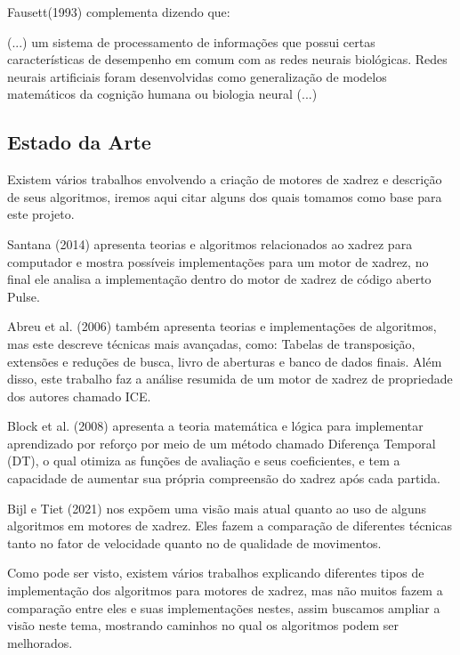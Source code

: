 Fausett(1993) complementa dizendo que:
\begin{citacao}
    (...) um sistema de processamento de informações que possui certas características de desempenho em comum com as redes
    neurais biológicas. Redes neurais artificiais foram desenvolvidas como generalização de modelos matemáticos da cognição
    humana ou biologia neural (...) \cite[tradução nossa, p.3]{FAUSETT}
\end{citacao}

\subsection{Estado da Arte}

Existem vários trabalhos envolvendo a criação de motores de xadrez e descrição de seus algoritmos, iremos aqui citar
alguns dos quais tomamos como base para este projeto.

Santana (2014) apresenta teorias e algoritmos relacionados ao xadrez para computador e mostra possíveis implementações
para um motor de xadrez, no final ele analisa a implementação dentro do motor de xadrez de código aberto Pulse.

Abreu et al. (2006) também apresenta teorias e implementações de algoritmos, mas este descreve técnicas mais avançadas,
como: Tabelas de transposição, extensões e reduções de busca, livro de aberturas e banco de dados finais. Além disso,
este trabalho faz a análise resumida de um motor de xadrez de propriedade dos autores chamado ICE.

Block et al. (2008) apresenta a teoria matemática e lógica para implementar aprendizado por reforço por meio de um
método chamado Diferença Temporal (DT), o qual otimiza as funções de avaliação e seus coeficientes, e tem a capacidade
de aumentar sua própria compreensão do xadrez após cada partida.

Bijl e Tiet (2021) nos expõem uma visão mais atual quanto ao uso de alguns algoritmos em motores de xadrez. Eles fazem
a comparação de diferentes técnicas tanto no fator de velocidade quanto no de qualidade de movimentos.

Como pode ser visto, existem vários trabalhos explicando diferentes tipos de implementação dos algoritmos para motores de xadrez,
mas não muitos fazem a comparação entre eles e suas implementações nestes, assim buscamos ampliar a visão neste tema, mostrando
caminhos no qual os algoritmos podem ser melhorados.
